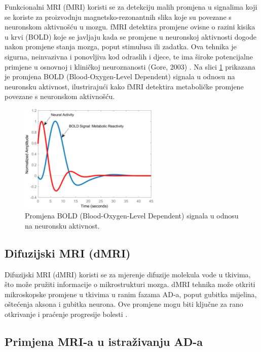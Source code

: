 \documentclass[zavrsnirad]{fer}
\begin{document}
Funkcionalni MRI (fMRI) koristi se za detekciju malih promjena u signalima koji se koriste za proizvodnju magnetsko-rezonantnih slika koje su povezane s neuronskom aktivnošću u mozgu. fMRI detektira promjene ovisne o razini kisika u krvi (BOLD) koje se javljaju kada se promjene u neuronskoj aktivnosti dogode nakon promjene stanja mozga, poput stimulusa ili zadatka. Ova tehnika je sigurna, neinvazivna i ponovljiva kod odraslih i djece, te ima široke potencijalne primjene u osnovnoj i kliničkoj neuroznanosti (Gore, 2003) \cite{Gore2003}. Na slici \ref{fig:fMRI_BOLD} prikazana je promjena BOLD (Blood-Oxygen-Level Dependent) signala u odnosu na neuronsku aktivnost, ilustrirajući kako fMRI detektira metaboličke promjene povezane s neuronskom aktivnošću.

\begin{figure}[h]
	\centering
	\includegraphics[width=0.6\textwidth]{Figures/BOLD.jpg}
	\caption{Promjena BOLD (Blood-Oxygen-Level Dependent) signala u odnosu na neuronsku aktivnost.\cite{Schaper573006}}
	\label{fig:fMRI_BOLD}
\end{figure}


\subsection{Difuzijski MRI (dMRI)}
Difuzijski MRI (dMRI) koristi se za mjerenje difuzije molekula vode u tkivima, što može pružiti informacije o mikrostrukturi mozga. dMRI tehnika može otkriti mikroskopske promjene u tkivima u ranim fazama AD-a, poput gubitka mijelina, oštećenja aksona i gubitka neurona. Ove promjene mogu biti ključne za rano otkrivanje i praćenje progresije bolesti \cite{Promteangtrong2015}.


\subsection{Primjena MRI-a u istraživanju AD-a}
\end{document}
